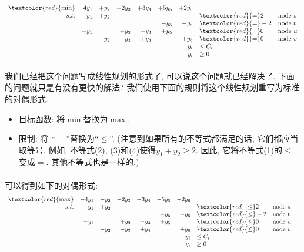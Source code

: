 \[
\begin{array}{rrrrrrrllllll}
\textcolor{red}{\bf \min } &4y_1&+ y_2&+ 2y_3&+3y_4&+5y_5&+2y_6 &         &  \\
 s.t. & y_1 &+ y_2&    &    &      &      & \textcolor{red}{=}  2 &  \text{node } s \\
      &     &     &    &    &  -y_5 &-y_6 & \textcolor{red}{=}  -2 &  \text{node } t\\
      & -y_1 &     &+y_3&-y_4&+y_5 &      & \textcolor{red}{=}  0 &  \text{node } u\\
      &     & -y_2&-y_3&+y_4&   &+y_6 & \textcolor{red}{=}  0 &  \text{node } v\\
      &     &     &    &    &      &  y_i & \leq  C_i & \\
      &     &     &    &    &      &  y_i & \geq  0 & \\
\end{array} \nonumber
\]
        \paragraph{}我们已经把这个问题写成线性规划的形式了, 可以说这个问题就已经解决了. 下面的问题就只是有没有更快的解法? 我们使用下面的规则将这个线性规划重写为标准的对偶形式.
\begin{itemize}
 \item 目标函数: 将$\min$替换为$\max$.
 \item 限制: 将 ``$=$''替换为``$\leq$''. (注意到如果所有的不等式都满足的话, 它们都应当取等号. 例如, 不等式(2), (3)和(4)使得$y_{1} + y_{2} \geq 2$. 因此, 它将不等式(1)的$\leq$变成$=$. 其他不等式也是一样的.)
\end{itemize} 
        \paragraph{}可以得到如下的对偶形式:
\[
\begin{array}{rrrrrrrllllll}
\textcolor{red}{ \max } &-4y_1&-y_2&-2y_3&-3y_4&-5y_5&-2y_6 &         &   \\
 s.t. & y_1 &+y_2&    &    &      &      & \textcolor{red}{\leq}  2 &  \text{node } s  \\
      &     &     &    &    &-y_5 &-y_6 & \textcolor{red}{\leq}  -2 &  \text{node } t  \\
      &-y_1 &     &+y_3&-y_4&+y_5 &      & \textcolor{red}{\leq}  0 &  \text{node } u  \\
      &     &-y_2&-y_3&+y_4&   &+y_6 & \textcolor{red}{\leq} 0 &  \text{node } v  \\
      &     &     &    &    &      &  y_i & \leq  C_i &  &\\
      &     &     &    &    &      &  y_i & \geq  0 &  &\\
\end{array}
\]
